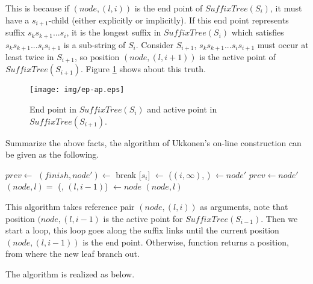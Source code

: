\documentclass{article}
\begin{document}
This is because if $(node, (l, i))$ is the end point of $SuffixTree(S_i)$,
it must have a $s_{i+1}$-child (either explicitly or implicitly).
If this end point represents suffix $s_ks_{k+1}...s_i$, it is the longest
suffix in $SuffixTree(S_i)$ which satisfies $s_ks_{k+1}...s_is_{i+1}$ is a sub-string
of $S_i$. Consider $S_{i+1}$, $s_ks_{k+1}...s_is_{i+1}$ must occur at least
twice in $S_{i+1}$, so position $(node, (l, i+1))$ is the active point of
$SuffixTree(S_{i+1})$. Figure \ref{fig:ep-ap} shows about this truth.

\begin{figure}[htbp]
  \centering
  \texttt{[image: img/ep-ap.eps]}
  \caption{End point in $SuffixTree(S_i)$ and active point in $SuffixTree(S_{i+1})$.}
  \label{fig:ep-ap}
\end{figure}

Summarize the above facts, the algorithm of Ukkonen's on-line construction can
be given as the following.

\begin{algorithmic}[1]
  \State $prev \gets$   %
  \Loop {}
    \State $(finish, node') \gets$ 
      \State break
    \EndIf
    \State {}[$s_i$] $\gets$ ($(i, \infty)$, )
    \State {} $\gets node'$
    \State $prev \gets node'$
    \State $(node, l) = $ (, $(l, i-1)$)
  \EndLoop
  \State {} $\gets node$
  \State \Return $(node, l)$ 
\EndFunction
\end{algorithmic}

This algorithm takes reference pair $(node, (l, i))$ as arguments, note that
position $(node, (l, i-1)$ is the active point for $SuffixTree(S_{i-1})$.
Then we start a loop, this loop goes along the suffix links until
the current position $(node, (l, i-1))$ is the end point. Otherwise,
function  returns a position, from
where the new leaf branch out.

The  algorithm is realized as below.
\end{document}
